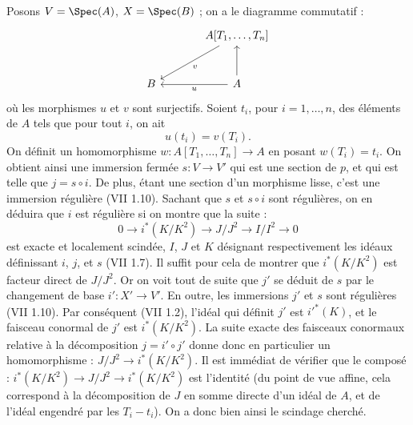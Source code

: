 Posons $V=\Spec(A)$, $X=\Spec(B)$ ; on a le diagramme commutatif :
\[
\begin{tikzcd}[column sep=large,row sep=large]
& A[T_1,\ldots,T_n] \arrow[dl,"v"]\\
B & A \arrow[l,"u"] \arrow[u]
\end{tikzcd}
\]
où les morphismes $u$ et $v$ sont surjectifs. Soient $t_i$, pour $i=1,\ldots,n$, des éléments de $A$ tels que pour tout $i$, on ait
\[
u(t_i)=v(T_i).
\]
On définit un homomorphisme $w:A[T_1,\ldots,T_n]\longrightarrow A$ en posant $w(T_i)=t_i$. On obtient ainsi une immersion fermée $s:V\to V'$ qui est une section de $p$, et qui est telle que $j=s\circ i$. De plus, étant une section d'un morphisme lisse, c'est une immersion régulière (VII 1.10). Sachant que $s$ et $s\circ i$ sont régulières, on en déduira que $i$ est régulière si on montre que la suite :
\[
0\longrightarrow i^*(K/K^2)\longrightarrow J/J^2\longrightarrow I/I^2\longrightarrow0
\]
est exacte et localement scindée, $I$, $J$ et $K$ désignant respectivement les idéaux définissant $i$, $j$, et $s$ (VII 1.7). Il suffit pour cela de montrer que $i^*(K/K^2)$ est facteur direct de $J/J^2$. Or on voit tout de suite que $j'$ se déduit de $s$ par le changement de base $i':X'\to V'$. En outre, les immersions $j'$ et $s$ sont régulières (VII 1.10). Par conséquent (VII 1.2), l'idéal qui définit $j'$ est $i'^*(K)$, et le faisceau conormal de $j'$ est $i^*(K/K^2)$. La suite exacte des faisceaux conormaux relative à la décomposition $j=i'\circ j'$ donne donc en particulier un homomorphisme : $J/J^2\longrightarrow i^*(K/K^2)$. Il est immédiat de vérifier que le composé : $i^*(K/K^2)\longrightarrow J/J^2\longrightarrow i^*(K/K^2)$ est l'identité (du point de vue affine, cela correspond à la décomposition de $J$ en somme directe d'un idéal de $A$, et de l'idéal engendré par les $T_i-t_i$). On a donc bien ainsi le scindage cherché.

